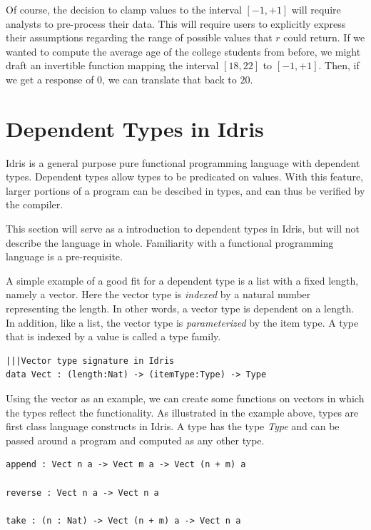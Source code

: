 \documentclass[12pt]{article}
\begin{document}

Of course, the decision to clamp values to the interval $[-1,+1]$ will require analysts to pre-process their data.
This will require users to explicitly express their assumptions regarding the range of possible values that $r$ could return.
If we wanted to compute the average age of the college students from before, we might draft an invertible function mapping the interval $[18,22]$ to $[-1,+1]$.
Then, if we get a response of $0$, we can translate that back to $20$.


\section{Dependent Types in Idris}\label{sec:dependent_types_in_idris}

Idris is a general purpose pure functional programming language with dependent types.
Dependent types allow types to be predicated on values.
With this feature, larger portions of a program can be descibed in types, and can thus be verified by the compiler.

This section will serve as a introduction to dependent types in Idris, but will not describe the language in whole. Familiarity with a functional programming language is a pre-requisite.

A simple example of a good fit for a dependent type is a list with a fixed length, namely a vector.
Here the vector type is \textit{indexed} by a natural number representing the length. 
In other words, a vector type is dependent on a length. 
In addition, like a list, the vector type is \textit{parameterized} by the item type.
A type that is indexed by a value is called a type family.

\begin{lstlisting}
|||Vector type signature in Idris
data Vect : (length:Nat) -> (itemType:Type) -> Type
\end{lstlisting}

Using the vector as an example, we can create some functions on vectors in which the types reflect the functionality. As illustrated in the example above, types are first class language constructs in Idris. A type has the type \textit{Type} and can be passed around a program and computed as any other type.

\begin{lstlisting}
append : Vect n a -> Vect m a -> Vect (n + m) a

reverse : Vect n a -> Vect n a

take : (n : Nat) -> Vect (n + m) a -> Vect n a
\end{lstlisting}
\end{document}
